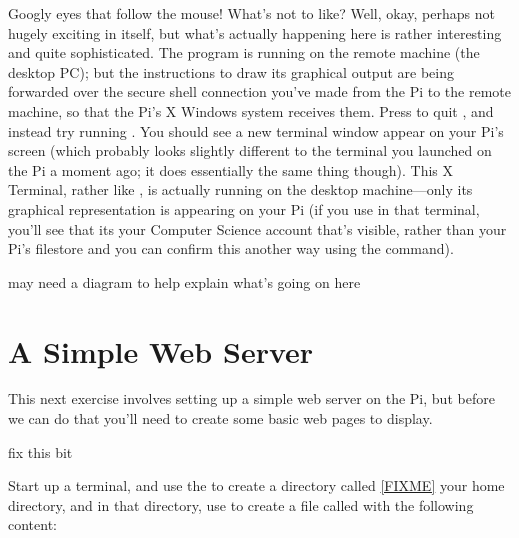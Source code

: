 
Googly eyes that follow the mouse! What's not to like? Well, okay, perhaps not hugely exciting in itself, but what's actually happening here is rather interesting and quite sophisticated. The  program is running on the remote machine (the desktop PC); but the instructions to draw its graphical output are being forwarded over the secure shell connection you've made from the Pi to the remote machine, so that the Pi's X Windows system receives them. Press  to quit , and instead try running . You should see a new terminal window appear on your Pi's screen (which probably looks slightly different to the terminal you launched on the Pi a moment ago; it does essentially the same thing though). This X Terminal, rather like , is actually running on the desktop machine---only its graphical representation is appearing on your Pi (if you use  in that terminal, you'll see that its your Computer Science account that's visible, rather than your Pi's filestore and you can confirm this another way using the  command). 


\begin{note}
may need a diagram to help explain what's going on here
\end{note}

\section{A Simple Web Server}

This next exercise involves setting up a simple web server on the Pi, but before we can do that you'll need to create some basic web pages to display. 

\begin{note}
fix this bit
\end{note}

Start up a terminal, and use the  to create a directory called \ref{FIXME} your home directory, and in that directory, use  to create a file called  with the following content:


